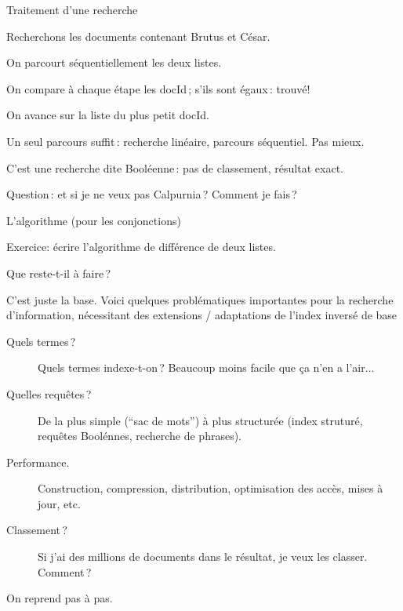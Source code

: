 \begin{frame}{Traitement d'une recherche}

Recherchons les documents contenant Brutus et César. 

\vfill

On parcourt \alert{séquentiellement} les deux listes.

\smallskip

On compare à chaque étape les docId\,; s'ils sont égaux\,: \alert{trouvé}!

\smallskip

On avance sur la liste du plus petit docId.


\vfill

\alert{Un seul parcours suffit}\,: recherche linéaire, parcours séquentiel. Pas mieux.

\vfill

 C'est une recherche dite \alert{Booléenne}\,: pas de classement, résultat exact.
 
 \vfill
 
 Question\,: et si je ne veux pas Calpurnia\,? Comment je fais\,?
 
\end{frame}


\begin{frame}{L'algorithme (pour les conjonctions)}


Exercice: écrire l'algorithme de \alert{différence} de deux listes.

\end{frame}


\begin{frame}{Que reste-t-il à faire\,?}

C'est juste la base. Voici quelques problématiques importantes pour la recherche
d'information, nécessitant des extensions / adaptations de l'index inversé de base

\begin{description}
 \item[Quels termes\,?] Quels termes indexe-t-on\,? Beaucoup moins facile que ça n'en a l'air...
 \item[Quelles requêtes\,?] De la plus simple (``sac de mots'') à plus 
                 structurée (index struturé, requêtes Boolénnes, recherche de phrases).
   \item[Performance.] Construction, compression, distribution, optimisation des accès,  mises à jour, etc.
  \item[Classement\,?] Si j'ai des millions de documents dans le résultat, je veux les classer. Comment\,?
\end{description}

On reprend pas à pas.

\end{frame}

